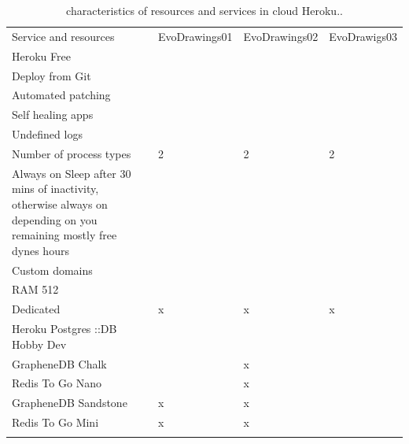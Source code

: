 \begin{table}
	\small
	\caption{characteristics of  resources and services in cloud Heroku..}
	\label{tab:shorurl} 
	\centering
	\small
	\begin{tabular}{p{4cm} p{3cm} p{3cm} p{3cm}  }
		\hline\noalign{\smallskip}
		Service and resources & EvoDrawings01 & EvoDrawings02 & EvoDrawigs03 \\
		\noalign{\smallskip}\hline\noalign{\smallskip}
		\small{Heroku Free} & \small{\checkmark} & \small{\checkmark} & \small{\checkmark}\\ \hline
		\small{Deploy from Git} & \small{\checkmark} & \small{\checkmark} & \small{\checkmark}\\ \hline
		\small{Automated patching} & \small{\checkmark} & \small{\checkmark} & \small{\checkmark}\\ \hline
		\small{Self healing apps} & \small{\checkmark} & \small{\checkmark} & \small{\checkmark}\\ \hline
		\small{Undefined logs} & \small{\checkmark} & \small{\checkmark} & \small{\checkmark}\\ \hline
		\small{Number of process types} & \small{2} & \small{2} & \small{2}\\ \hline
		\small{Always on Sleep after 30 mins of inactivity, otherwise always on depending on you remaining mostly free dynes hours} & \small{\checkmark} & \small{\checkmark} & \small{\checkmark}\\ \hline
		\small{Custom domains} & \small{\checkmark} & \small{\checkmark} & \small{\checkmark}\\ \hline
		\small{RAM 512} & \small{\checkmark} & \small{\checkmark} & \small{\checkmark}\\ \hline
		\small{Dedicated} & \small{x} & \small{x} & \small{x}\\ \hline
		\small{Heroku Postgres ::DB Hobby Dev} & \small{\checkmark} & \small{\checkmark} & \small{\checkmark}\\ \hline
		\small{GrapheneDB Chalk} & \small{\checkmark} & \small{x} & \small{\checkmark}\\ \hline
		\small{Redis To Go Nano} & \small{\checkmark} & \small{x} & \small{\checkmark}\\ \hline
		\small{GrapheneDB Sandstone} & \small{x} & \small{x} & \small{\checkmark}\\ \hline
		\small{Redis To Go Mini} & \small{x} & \small{x} & \small{\checkmark}\\ \hline
		
		
		\noalign{\smallskip}\hline
	\end{tabular}
\end{table}

